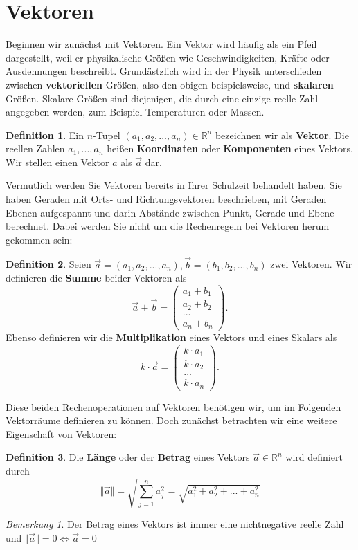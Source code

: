 \documentclass[11pt,a4paper]{scrartcl}
\theoremstyle{remark}
\newtheorem{note}{Bemerkung}
\theoremstyle{definition}
\newtheorem{definition}{Definition}[section]
\begin{document}
\section{Vektoren}
Beginnen wir zunächst mit Vektoren. Ein Vektor wird häufig als ein Pfeil dargestellt, weil er physikalische Größen wie Geschwindigkeiten, Kräfte oder Ausdehnungen beschreibt. Grundästzlich wird in der Physik unterschieden zwischen \textbf{vektoriellen} Größen, also den obigen beispielsweise, und \textbf{skalaren} Größen. Skalare Größen sind diejenigen, die durch eine einzige reelle Zahl angegeben werden, zum Beispiel Temperaturen oder Massen. 
\begin{definition}
Ein $n$-Tupel $(a_1, a_2, ..., a_n) \in \mathbb{R}^{n}$ bezeichnen wir als \textbf{Vektor}. Die reellen Zahlen $a_1, ..., a_n$ heißen \textbf{Koordinaten} oder \textbf{Komponenten} eines Vektors. Wir stellen einen Vektor $a$ als $\vec{a}$ dar.
\end{definition}
Vermutlich werden Sie Vektoren bereits in Ihrer Schulzeit behandelt haben. Sie haben Geraden mit Orts- und Richtungsvektoren beschrieben, mit Geraden Ebenen aufgespannt und darin Abstände zwischen Punkt, Gerade und Ebene berechnet. Dabei werden Sie nicht um die Rechenregeln bei Vektoren herum gekommen sein:
\begin{definition} Seien $\vec{a} = (a_1, a_2, ..., a_n), \vec{b} = (b_1, b_2, ..., b_n)$ zwei Vektoren. Wir definieren die \textbf{Summe} beider Vektoren als
\[\vec{a} + \vec{b} = \left( \begin{matrix} a_1 + b_1 \\ a_2 + b_2 \\ ... \\ a_n + b_n \end{matrix} \right).\]
Ebenso definieren wir die \textbf{Multiplikation} eines Vektors und eines Skalars als
\[ k \cdot \vec{a} = \left( \begin{matrix} k \cdot a_1 \\ k \cdot a_2 \\ ... \\ k \cdot a_n \end{matrix}\right).\]
\end{definition}
Diese beiden Rechenoperationen auf Vektoren benötigen wir, um im Folgenden Vektorräume definieren zu können. Doch zunächst betrachten wir eine weitere Eigenschaft von Vektoren:
\begin{definition}
Die \textbf{Länge} oder der \textbf{Betrag} eines Vektors $\vec{a} \in \mathbb{R}^{n}$ wird definiert durch
\[\Vert \vec{a} \Vert = \sqrt{\sum\limits_{j = 1}^{n} a_{j}^{2}} = \sqrt{a_{1}^{2} + a_{2}^{2} + ... + a_{n}^{2}}\]
\end{definition}
\begin{note}
Der Betrag eines Vektors ist immer eine nichtnegative reelle Zahl und $\Vert \vec{a} \Vert = 0 \Leftrightarrow \vec{a} = 0$
\end{note}
\end{document}
